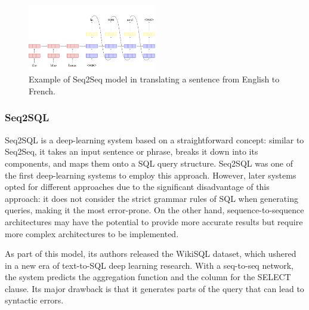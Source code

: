 \begin{figure}[ht]
    \centering
    \includegraphics[width=0.5\textwidth]{pics/seq2seq.png}
    \caption{Example of Seq2Seq model in translating a sentence from English to French.}
    \label{fig:seq2seq}
\end{figure}

\subsubsection{Seq2SQL}

Seq2SQL \cite{zhong_seq2sql_2017} is a deep-learning system based on a straightforward concept: similar to Seq2Seq\cite{DBLP:journals/corr/SutskeverVL14}, it takes an input sentence or phrase, breaks it down into its components, and maps them onto a SQL query structure. Seq2SQL was one of the first deep-learning systems to employ this approach. However, later systems opted for different approaches due to the significant disadvantage of this approach: it does not consider the strict grammar rules of SQL when generating queries, making it the most error-prone. On the other hand, sequence-to-sequence architectures may have the potential to provide more accurate results but require more complex architectures to be implemented.

As part of this model, its authors released the WikiSQL dataset, which ushered in a new era of text-to-SQL deep learning research. With a seq-to-seq network, the system predicts the aggregation function and the column for the SELECT clause. Its major drawback is that it generates parts of the query that can lead to syntactic errors.